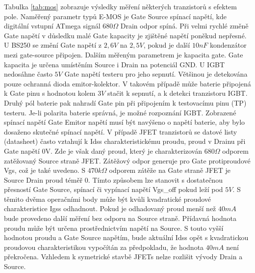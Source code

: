 Tabulka \ref{tab:mos} zobrazuje výsledky měření některých tranzistorů s efektem pole.
Naměřený parametr typů E-MOS je Gate Source spínací napětí, kde digitální vstupní
ATmega signál \(680\Omega\) Drain odpor spíná.
Při velmi rychlé změně Gate napětí v důsledku malé Gate kapacity je zjištěné napětí poněkud nepřesné.
U BS250 se změní Gate napětí z \(2,6V\) na \(2,5V\), pokud je další \(10nF\) kondenzátor
mezi gate-source připojen.
Dalším měřeným parametrem je kapacita gate.
Gate kapacita je určena umístěním Source i Drain na potenciál GND.
U IGBT nedosáhne často \(5V\) Gate napětí testeru pro jeho sepnutí.
Většinou je detekována pouze ochranná dioda emitor-kolektor.
V takovém případě může baterie připojená k Gate pinu s hodnotou kolem \(3V\) stačit k sepnutí,
a k detekci tranzistoru IGBT. Druhý pól baterie pak nahradí Gate pin při připojením k testovacímu
pinu (TP) testeru.
Je-li polarita baterie správná, je možné rozpoznání IGBT.
Zobrazené spínací napětí Gate Emitor napětí musí být navýšeno o napětí baterie,
aby bylo dosaženo skutečné spínací napětí.
V případě JFET tranzistorů se datové listy (datasheet) často vztahují k Idss charakteristickému proudu,
proud v Drainu při Gate napětí 0V.
Zde je však daný proud, který je charakterizován \(680\Omega\) odporem zatěžovaný Source straně JFET.
Zátěžový odpor generuje pro Gate protiproudové Vgs, což je také uvedeno.
S \(470k\Omega\) odporem zátěže na Gate straně JFET je Source Drain proud téměř 0.
Tímto způsobem lze stanovit s dostatečnou přesností Gate Source, spínací či vypínací napětí Vgs\_off pokud leží pod \(5V\).
S těmito dvěma operačními body může být kvůli kvadratické proudové charakteristice Igss odhadnout.
Pokud je odhadovaný proud menší než \(40mA\) bude provedeno další měření bez odporu na Source straně.
Přídavná hodnota proudu může být určena prostřednictvím napětí na Source.
S touto vyšší hodnotou proudu a Gate Source napětím, bude aktuální Idss opět s kvadratickou proudovou charakteristikou vypočítán za předpokladu, že hodnota \(40mA\) není překročena.
Vzhledem k symetrické stavbě JFETs nelze rozlišit vývody Drain a Source.

